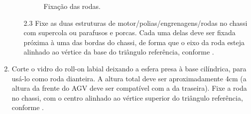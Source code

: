 \documentclass{textolivre-html}
\begin{document}
\begin{enumerate}
\begin{enumerate}
\begin{figure}[H]
\begin{minipage}{0.31\textwidth}
    \subcaption{}
    \end{minipage}
    \caption{Fixação das rodas.}
    \label{fig03}
    \end{figure}

    \item[2.3] Fixe as duas estruturas de motor/polias/engrenagens/rodas no chassi
    com supercola ou parafusos e porcas. Cada uma delas deve ser fixada próxima à
    uma das bordas do chassi, de forma que o eixo da roda esteja alinhado ao
    vértice da base do triângulo referência, conforme . 

    \end{enumerate}

    \item Corte o vidro do roll-on labial deixando a esfera presa à base
    cilíndrica, para usá-lo como roda dianteira. A altura total deve ser
    aproximadamente 4cm (a altura da frente do AGV deve ser compatível com a da
    traseira). Fixe a roda no chassi, com o centro alinhado ao vértice superior
    do triângulo referência, conforme .


\end{enumerate}
\end{document}
